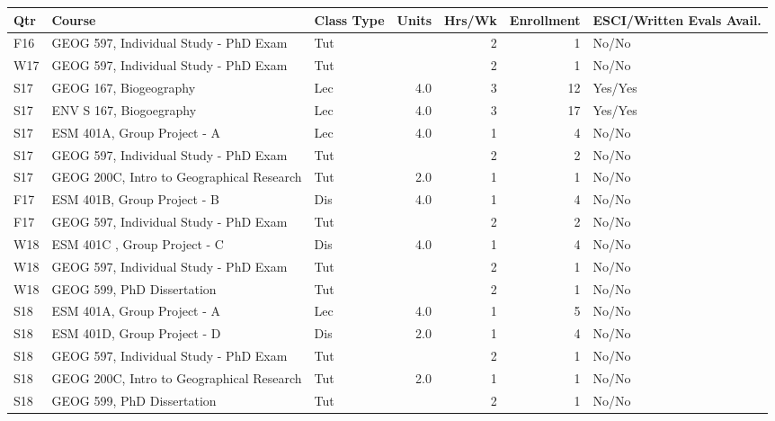 
\begin{longtable}{lp{6.5cm}p{1cm}rrrp{2cm}}
Qtr & Course & Class Type & Units & Hrs/Wk & Enrollment & ESCI/Written Evals Avail.\\
\hline 
\endhead 
F16 & GEOG 597, Individual Study - PhD Exam & Tut &  & 2 & 1 & No/No \\
W17 & GEOG 597, Individual Study - PhD Exam & Tut &  & 2 & 1 & No/No \\
S17 & GEOG 167, Biogeography & Lec & 4.0 & 3 & 12 & Yes/Yes \\
S17 & ENV S 167, Biogoegraphy & Lec & 4.0 & 3 & 17 & Yes/Yes \\
S17 & ESM 401A, Group Project - A & Lec & 4.0 & 1 & 4 & No/No \\
S17 & GEOG 597, Individual Study - PhD Exam & Tut &  & 2 & 2 & No/No \\
S17 & GEOG 200C, Intro to Geographical Research & Tut & 2.0 & 1 & 1 & No/No \\
F17 & ESM 401B, Group Project - B & Dis & 4.0 & 1 & 4 & No/No \\
F17 & GEOG 597, Individual Study - PhD Exam & Tut &  & 2 & 2 & No/No \\
W18 & ESM 401C , Group Project - C & Dis & 4.0 & 1 & 4 & No/No \\
W18 & GEOG 597, Individual Study - PhD Exam & Tut &  & 2 & 1 & No/No \\
W18 & GEOG 599, PhD Dissertation & Tut &  & 2 & 1 & No/No \\
S18 & ESM 401A, Group Project - A & Lec & 4.0 & 1 & 5 & No/No \\
S18 & ESM 401D, Group Project - D & Dis & 2.0 & 1 & 4 & No/No \\
S18 & GEOG 597, Individual Study - PhD Exam & Tut &  & 2 & 1 & No/No \\
S18 & GEOG 200C, Intro to Geographical Research & Tut & 2.0 & 1 & 1 & No/No \\
S18 & GEOG 599, PhD Dissertation & Tut &  & 2 & 1 & No/No \\
\end{longtable}

